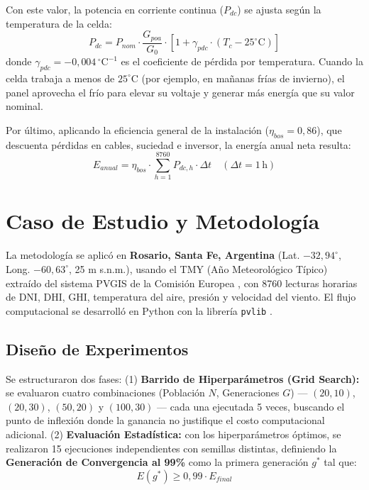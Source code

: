 \documentclass[12pt, a4paper, twocolumn]{article}
\begin{document}
Con este valor, la potencia en corriente continua ($P_{dc}$) se ajusta según la temperatura de la celda:
\begin{equation}
P_{dc} = P_{nom} \cdot \frac{G_{poa}}{G_0} \cdot \left[ 1 + \gamma_{pdc} \cdot (T_c - 25^\circ\text{C}) \right]
\end{equation}
donde $\gamma_{pdc} = -0,004\,^\circ\text{C}^{-1}$ es el coeficiente de pérdida por temperatura. Cuando la celda trabaja a menos de $25^\circ\text{C}$ (por ejemplo, en mañanas frías de invierno), el panel aprovecha el frío para elevar su voltaje y generar más energía que su valor nominal.

Por último, aplicando la eficiencia general de la instalación ($\eta_{bos} = 0,86$), que descuenta pérdidas en cables, suciedad e inversor, la energía anual neta resulta:
\begin{equation}
E_{anual} = \eta_{bos} \cdot \sum_{h=1}^{8760} P_{dc, h} \cdot \Delta t \quad (\Delta t = 1\,\text{h})
\end{equation}

\section{Caso de Estudio y Metodología}
La metodología se aplicó en \textbf{Rosario, Santa Fe, Argentina} (Lat. $-32,94^\circ$, Long. $-60,63^\circ$, 25 m s.n.m.), usando el TMY (Año Meteorológico Típico) extraído del sistema PVGIS de la Comisión Europea \cite{huld2012pvgis}, con 8760 lecturas horarias de DNI, DHI, GHI, temperatura del aire, presión y velocidad del viento. El flujo computacional se desarrolló en Python con la librería \texttt{pvlib} \cite{pvlib}.

\subsection{Diseño de Experimentos}
Se estructuraron dos fases: (1) \textbf{Barrido de Hiperparámetros (Grid Search):} se evaluaron cuatro combinaciones (Población $N$, Generaciones $G$) --- $(20,10)$, $(20,30)$, $(50,20)$ y $(100,30)$ --- cada una ejecutada 5 veces, buscando el punto de inflexión donde la ganancia no justifique el costo computacional adicional. (2) \textbf{Evaluación Estadística:} con los hiperparámetros óptimos, se realizaron 15 ejecuciones independientes con semillas distintas, definiendo la \textbf{Generación de Convergencia al 99\%} como la primera generación $g^*$ tal que:
\begin{equation}
E(g^*) \ge 0,99 \cdot E_{final}
\end{equation}
\end{document}
